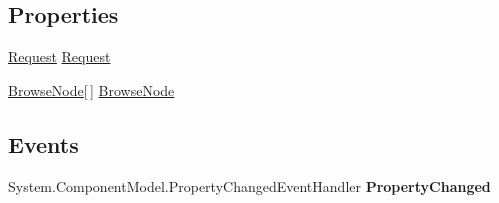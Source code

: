 \subsection*{Properties}
\begin{DoxyCompactItemize}
\item 
\hypertarget{class_price___comparison_1_1amazon_1_1ecs_1_1_browse_nodes_ae414582a36fda84d9be7e72cf2e9b055}{\hyperlink{class_price___comparison_1_1amazon_1_1ecs_1_1_request}{Request} \hyperlink{class_price___comparison_1_1amazon_1_1ecs_1_1_browse_nodes_ae414582a36fda84d9be7e72cf2e9b055}{Request}}\label{class_price___comparison_1_1amazon_1_1ecs_1_1_browse_nodes_ae414582a36fda84d9be7e72cf2e9b055}

\begin{DoxyCompactList}\small\item\em \end{DoxyCompactList}\item 
\hypertarget{class_price___comparison_1_1amazon_1_1ecs_1_1_browse_nodes_a92195f90bb8f347e441879b6a1f2428e}{\hyperlink{class_price___comparison_1_1amazon_1_1ecs_1_1_browse_node}{Browse\-Node}\mbox{[}$\,$\mbox{]} \hyperlink{class_price___comparison_1_1amazon_1_1ecs_1_1_browse_nodes_a92195f90bb8f347e441879b6a1f2428e}{Browse\-Node}}\label{class_price___comparison_1_1amazon_1_1ecs_1_1_browse_nodes_a92195f90bb8f347e441879b6a1f2428e}

\begin{DoxyCompactList}\small\item\em \end{DoxyCompactList}\end{DoxyCompactItemize}
\subsection*{Events}
\begin{DoxyCompactItemize}
\item 
\hypertarget{class_price___comparison_1_1amazon_1_1ecs_1_1_browse_nodes_a3ce4cfe4f4495a227f6159f6b341b7b1}{System.\-Component\-Model.\-Property\-Changed\-Event\-Handler {\bfseries Property\-Changed}}\label{class_price___comparison_1_1amazon_1_1ecs_1_1_browse_nodes_a3ce4cfe4f4495a227f6159f6b341b7b1}

\end{DoxyCompactItemize}
